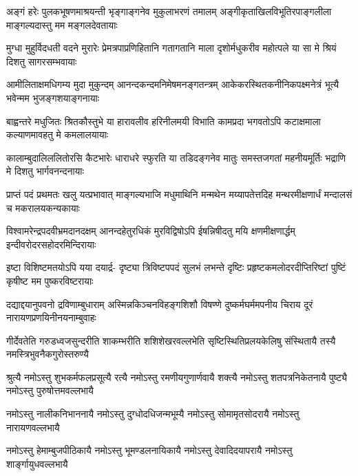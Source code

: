 
\fourlineindentedshloka
{अङ्गं हरेः पुलकभूषणमाश्रयन्ती}
{भृङ्गाङ्गनेव मुकुलाभरणं तमालम्}
{अङ्गीकृताखिलविभूतिरपाङ्गलीला}
{माङ्गल्यदास्तु मम मङ्गलदेवतायाः}

\fourlineindentedshloka
{मुग्धा मुहुर्विदधती वदने मुरारेः}
{प्रेमत्रपाप्रणिहितानि गतागतानि}
{माला दृशोर्मधुकरीव महोत्पले या}
{सा मे श्रियं दिशतु सागरसम्भवायाः}

\fourlineindentedshloka
{आमीलिताक्षमधिगम्य मुदा मुकुन्दम्}
{आनन्दकन्दमनिमेषमनङ्गतन्त्रम्}
{आकेकरस्थितकनीनिकपक्ष्मनेत्रं}
{भूत्यै भवेन्मम भुजङ्गशयाङ्गनायाः}

\fourlineindentedshloka
{बाह्वन्तरे मधुजितः श्रितकौस्तुभे या}
{हारावलीव हरिनीलमयी विभाति}
{कामप्रदा भगवतोऽपि कटाक्षमाला}
{कल्याणमावहतु मे कमलालयायाः}

\fourlineindentedshloka
{कालाम्बुदालिललितोरसि कैटभारेः}
{धाराधरे स्फुरति या तडिदङ्गनेव}
{मातुः समस्तजगतां महनीयमूर्तिः}
{भद्राणि मे दिशतु भार्गवनन्दनायाः}

\fourlineindentedshloka
{प्राप्तं पदं प्रथमतः खलु यत्प्रभावात्}
{माङ्गल्यभाजि मधुमाथिनि मन्मथेन}
{मय्यापतेत्तदिह मन्थरमीक्षणार्धं}
{मन्दालसं च मकरालयकन्यकायाः}

\fourlineindentedshloka
{विश्वामरेन्द्रपदवीभ्रमदानदक्षम्}
{आनन्दहेतुरधिकं मुरविद्विषोऽपि}
{ईषन्निषीदतु मयि क्षणमीक्षणार्द्धम्}
{इन्दीवरोदरसहोदरमिन्दिरायाः}

\fourlineindentedshloka
{इष्टा विशिष्टमतयोऽपि यया दयार्द्र-}
{दृष्ट्या त्रिविष्टपपदं सुलभं लभन्ते}
{दृष्टिः प्रहृष्टकमलोदरदीप्तिरिष्टां}
{पुष्टिं कृषीष्ट मम पुष्करविष्टरायाः}

\fourlineindentedshloka
{दद्याद्दयानुपवनो द्रविणाम्बुधाराम्}
{अस्मिन्नकिञ्चनविहङ्गशिशौ विषण्णे}
{दुष्कर्मघर्ममपनीय चिराय दूरं}
{नारायणप्रणयिनीनयनाम्बुवाहः}

\fourlineindentedshloka
{गीर्देवतेति गरुडध्वजसुन्दरीति}
{शाकम्भरीति शशिशेखरवल्लभेति}
{सृष्टिस्थितिप्रलयकेलिषु संस्थितायै}
{तस्यै नमस्त्रिभुवनैकगुरोस्तरुण्यै}

\fourlineindentedshloka
{श्रुत्यै नमोऽस्तु शुभकर्मफलप्रसूत्यै}
{रत्यै नमोऽस्तु रमणीयगुणार्णवायै}
{शक्त्यै नमोऽस्तु शतपत्रनिकेतनायै}
{पुष्ट्यै नमोऽस्तु पुरुषोत्तमवल्लभायै}

\fourlineindentedshloka
{नमोऽस्तु नालीकनिभाननायै}
{नमोऽस्तु दुग्धोदधिजन्मभूम्यै}
{नमोऽस्तु सोमामृतसोदरायै}
{नमोऽस्तु नारायणवल्लभायै}

\fourlineindentedshloka
{नमोऽस्तु हेमाम्बुजपीठिकायै}
{नमोऽस्तु भूमण्डलनायिकायै}
{नमोऽस्तु देवादिदयापरायै}
{नमोऽस्तु शार्ङ्गायुधवल्लभायै}

